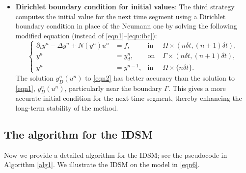 \documentclass[onefignum,onetabnum]{siamart190516}
\numberwithin{equation}{section}
\begin{document}
\begin{itemize}
\item \textbf{Dirichlet boundary condition for initial values}:
The third strategy computes the initial value for the next time segment using a Dirichlet boundary condition in place of the Neumann one by solving the following modified equation (instead of \eqref{eqn1}--\eqref{eqn:ibc}):
\begin{equation}\label{eqn2}
\left\{
\begin{aligned}
\partial_{t} y^{n} - \Delta y^{n} + N(y^{n})u^{n} &= f, & \text{in }& \Omega \times (n\delta t, (n+1)\delta t), \\
y^{n} &= y_{d}^{n}, & \text{on }& \Gamma \times (n\delta t, (n+1)\delta t), \\
y^{n} &= y^{n-1}, & \text{in }& \Omega \times \{n\delta t\}.
\end{aligned}
\right.
\end{equation}
The solution $y_{D}^{n}(u^{n})$  to \eqref{eqn2} has better accuracy than the solution to \eqref{eqn1}, $y_{D}^{n}(u^{n})$, particularly near the boundary $\Gamma$.
This gives a more accurate initial condition for the next time segment, thereby enhancing the long-term stability of the method.
\end{itemize}

\subsection{The algorithm for the IDSM}\label{subsec:aid}

Now we provide a detailed algorithm for the IDSM; see the pseudocode in Algorithm \ref{alg1}. We illustrate the IDSM on the model in \eqref{eqn6}.
\end{document}

